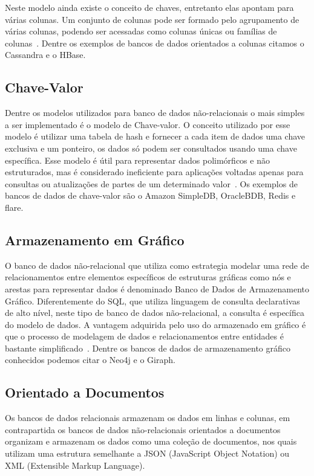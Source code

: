 \documentclass[a4paper,12pt,onecolumn,titlepage]{article}
\begin{document}
Neste modelo ainda existe o conceito de chaves, entretanto elas apontam para várias colunas. Um conjunto de colunas pode ser formado pelo agrupamento de várias colunas, podendo ser acessadas como colunas únicas ou famílias de colunas~\citep{patil:2017}. Dentre os exemplos de bancos de dados orientados a colunas citamos o Cassandra e o HBase.

\subsection{Chave-Valor}
\label{subsec:chave-valor}

Dentre os modelos utilizados para banco de dados não-relacionais o mais simples a ser implementado é o modelo de Chave-valor. O conceito utilizado por esse modelo é utilizar uma tabela de hash e fornecer a cada item de dados uma chave exclusiva e um ponteiro, os dados só podem ser consultados usando uma chave específica. Esse modelo é útil para representar dados polimórficos e não estruturados, mas é considerado ineficiente para aplicações voltadas apenas para consultas ou atualizações de partes de um determinado valor~\citep{patil:2017}. Os exemplos de bancos de dados de chave-valor são o Amazon SimpleDB, OracleBDB, Redis e flare.

\subsection{Armazenamento em Gráfico}
\label{subsec:grafico}

O banco de dados não-relacional que utiliza como estrategia modelar uma rede de relacionamentos entre elementos específicos de estruturas gráficas como nós e arestas para representar dados é denominado Banco de Dados de Armazenamento Gráfico. Diferentemente do SQL, que utiliza linguagem de consulta declarativas de alto nível, neste tipo de banco de dados não-relacional, a consulta é específica do modelo de dados. A vantagem adquirida pelo uso do armazenado em gráfico é que o processo de modelagem de dados e relacionamentos entre entidades é bastante simplificado~\citep{patil:2017}. Dentre os bancos de dados de armazenamento gráfico conhecidos podemos citar o Neo4j e o Giraph.

\subsection{Orientado a Documentos}
\label{subsec:documentos}

Os bancos de dados relacionais armazenam os dados em linhas e colunas, em contrapartida os bancos de dados não-relacionais orientados a documentos organizam e armazenam os dados como uma coleção de documentos, nos quais utilizam uma estrutura semelhante a JSON (JavaScript Object Notation) ou XML (Extensible Markup Language). 
\end{document}
